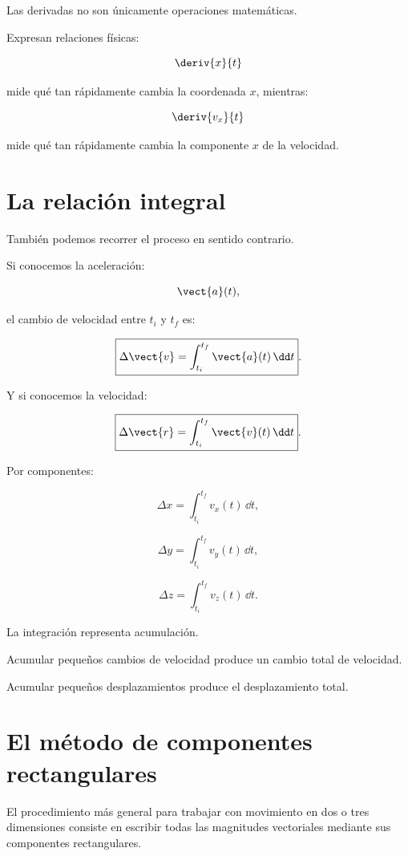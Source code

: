 \begin{interpretacion}
Las derivadas no son únicamente operaciones matemáticas.

Expresan relaciones físicas:

\[
\deriv{x}{t}
\]

mide qué tan rápidamente cambia la coordenada \(x\), mientras:

\[
\deriv{v_x}{t}
\]

mide qué tan rápidamente cambia la componente \(x\) de la velocidad.
\end{interpretacion}


\section{La relación integral}

También podemos recorrer el proceso en sentido contrario.

Si conocemos la aceleración:

\[
\vect{a}(t),
\]

el cambio de velocidad entre \(t_i\) y \(t_f\) es:

\[
\boxed{
\Delta\vect{v}
=
\int_{t_i}^{t_f}
\vect{a}(t)\,\dd t
}.
\]

Y si conocemos la velocidad:

\[
\boxed{
\Delta\vect{r}
=
\int_{t_i}^{t_f}
\vect{v}(t)\,\dd t
}.
\]

Por componentes:

\[
\Delta x
=
\int_{t_i}^{t_f}
v_x(t)\,\dd t,
\]

\[
\Delta y
=
\int_{t_i}^{t_f}
v_y(t)\,\dd t,
\]

\[
\Delta z
=
\int_{t_i}^{t_f}
v_z(t)\,\dd t.
\]

\begin{interpretacion}
La integración representa acumulación.

Acumular pequeños cambios de velocidad produce un cambio total de velocidad.

Acumular pequeños desplazamientos produce el desplazamiento total.
\end{interpretacion}


\section{El método de componentes rectangulares}

El procedimiento más general para trabajar con movimiento en dos o tres
dimensiones consiste en escribir todas las magnitudes vectoriales mediante sus
componentes rectangulares.

